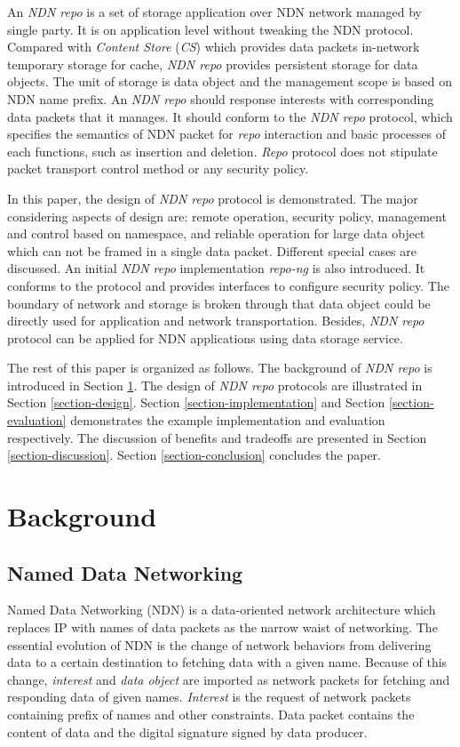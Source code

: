\documentclass[conference]{IEEEtran}
\begin{document}
An \emph{NDN repo} is a set of storage application over NDN network managed by single party. It is on application level without tweaking the NDN protocol. Compared with \emph{Content Store} (\emph{CS}) which provides data packets in-network temporary storage for cache, \emph{NDN repo} provides persistent storage for data objects. The unit of storage is data object and the management scope is based on NDN name prefix. An \emph{NDN repo} should response interests with corresponding data packets that it manages. It should conform to the \emph{NDN repo} protocol, which specifies the semantics of NDN packet for \emph{repo} interaction and basic processes of each functions, such as insertion and deletion. \emph{Repo} protocol does not stipulate packet transport control method or any security policy.

In this paper, the design of \emph{NDN repo} protocol is demonstrated. The major considering aspects of design are: remote operation, security policy, management and control based on namespace, and reliable operation for large data object which can not be framed in a single data packet. Different special cases are discussed. An initial \emph{NDN repo} implementation \emph{repo-ng} is also introduced. It conforms to the protocol and provides interfaces to configure security policy. The boundary of network and storage is broken through that data object could be directly used for application and network transportation. Besides, \emph{NDN repo} protocol can be applied for NDN applications using data storage service.

The rest of this paper is organized as follows.  The background of \emph{NDN repo} is introduced in Section \ref{section-background}. The design of \emph{NDN repo} protocols are illustrated in Section \ref{section-design}. Section \ref{section-implementation} and Section \ref{section-evaluation} demonstrates the example implementation and evaluation respectively.  The discussion of benefits and tradeoffs are presented in Section \ref{section-discussion}. Section \ref{section-conclusion} concludes the paper.

\section{Background} \label{section-background}
\subsection{Named Data Networking}
Named Data Networking (NDN) \cite{zhang2010named} is a data-oriented network architecture which replaces IP with names of data packets as the narrow waist of networking. The essential evolution of NDN is the change of network behaviors from delivering data to a certain destination to fetching data with a given name. \cite{zhang2010named} Because of this change, \emph{interest} and \emph{data object} are imported as network packets for fetching and responding data of given names. \emph{Interest} is the request of network packets containing prefix of names and other constraints. Data packet contains the content of data and the digital signature signed by data producer.
\end{document}
